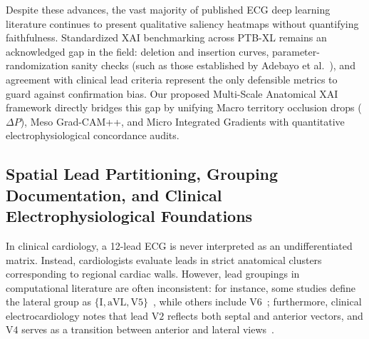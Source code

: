 \documentclass[5p,twocolumn,10pt]{elsarticle}
\begin{document}
Despite these advances, the vast majority of published ECG deep learning literature continues to present qualitative saliency heatmaps without quantifying faithfulness. Standardized XAI benchmarking across PTB-XL remains an acknowledged gap in the field: deletion and insertion curves, parameter-randomization sanity checks (such as those established by Adebayo et al.~\cite{adebayo2018sanity}), and agreement with clinical lead criteria represent the only defensible metrics to guard against confirmation bias. Our proposed Multi-Scale Anatomical XAI framework directly bridges this gap by unifying Macro territory occlusion drops ($\Delta P$), Meso Grad-CAM++, and Micro Integrated Gradients with quantitative electrophysiological concordance audits.

\subsection{Spatial Lead Partitioning, Grouping Documentation, and Clinical Electrophysiological Foundations}
\label{sec:lead_grouping_justification}
In clinical cardiology, a 12-lead ECG is never interpreted as an undifferentiated matrix. Instead, cardiologists evaluate leads in strict anatomical clusters corresponding to regional cardiac walls. However, lead groupings in computational literature are often inconsistent: for instance, some studies define the lateral group as $\{\text{I}, \text{aVL}, \text{V5}\}$~\cite{sweeney2024lead}, while others include $\text{V6}$~\cite{anat_graph2026}; furthermore, clinical electrocardiology notes that lead $\text{V2}$ reflects both septal and anterior vectors, and $\text{V4}$ serves as a transition between anterior and lateral views~\cite{wagner2009aha}.
\end{document}
